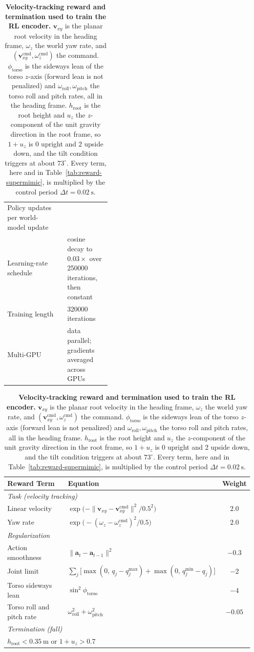 \begin{table}[p]
\begin{tabular}{@{}ll>{\raggedright\arraybackslash}p{0.42\linewidth}@{}}
Policy updates per world-model update & & 1 \\
Learning-rate schedule & & cosine decay to $0.03\times$ over \num{250000} iterations, then constant \\
Training length & & \num{320000} iterations \\
Multi-GPU & & data parallel; gradients averaged across GPUs \\
\bottomrule
\end{tabular}
\vspace{0.6em}
\caption{\textbf{SuperMimic hyperparameters.}}
\label{tab:hyperparams}
\vspace{1.2em}
\centering
\begin{tabular}{llc}
\toprule
\textbf{Reward Term} & \textbf{Equation} & \textbf{Weight} \\
\midrule
\multicolumn{3}{l}{\emph{Task (velocity tracking)}}\\
Linear velocity
& $\displaystyle \exp\!\Big( -\|\mathbf{v}_{xy}-\mathbf{v}^{\mathrm{cmd}}_{xy}\|^{2} / 0.5^{2} \Big)$
& $2.0$\\[1mm]
Yaw rate
& $\displaystyle \exp\!\Big( -(\omega_{z}-\omega^{\mathrm{cmd}}_{z})^{2} / 0.5 \Big)$
& $2.0$\\[1mm]
\midrule
\multicolumn{3}{l}{\emph{Regularization}}\\
Action smoothness
& $\|\mathbf{a}_{t}-\mathbf{a}_{t-1}\|^{2}$
& $-0.3$\\[1mm]
Joint limit
& $\sum_{j}\big[\max(0,\,q_{j}-q_{j}^{\max}) + \max(0,\,q_{j}^{\min}-q_{j})\big]$
& $-2$\\[1mm]
Torso sideways lean
& $\sin^{2}\phi_{\mathrm{torso}}$
& $-4$\\[1mm]
Torso roll and pitch rate
& $\omega_{\mathrm{roll}}^{2}+\omega_{\mathrm{pitch}}^{2}$
& $-0.05$\\
\midrule
\multicolumn{3}{l}{\emph{Termination (fall)}}\\
\multicolumn{3}{l}{$h_{\mathrm{root}} < \qty{0.35}{\metre}$ \;or\; $1 + u_{z} > 0.7$}\\
\bottomrule
\end{tabular}
\vspace{0.6em}
\caption{\textbf{Velocity-tracking reward and termination used to train the RL encoder.} $\mathbf{v}_{xy}$ is the planar root velocity in the heading frame, $\omega_z$ the world yaw rate, and $(\mathbf{v}^{\mathrm{cmd}}_{xy}, \omega^{\mathrm{cmd}}_{z})$ the command. $\phi_{\mathrm{torso}}$ is the sideways lean of the torso $z$-axis (forward lean is not penalized) and $\omega_{\mathrm{roll}}, \omega_{\mathrm{pitch}}$ the torso roll and pitch rates, all in the heading frame. $h_{\mathrm{root}}$ is the root height and $u_z$ the $z$-component of the unit gravity direction in the root frame, so $1+u_z$ is 0 upright and 2 upside down, and the tilt condition triggers at about $73^\circ$. Every term, here and in Table~\ref{tab:reward-supermimic}, is multiplied by the control period $\Delta t=\qty{0.02}{\second}$.}
\label{tab:reward-velocity}
\end{table}


